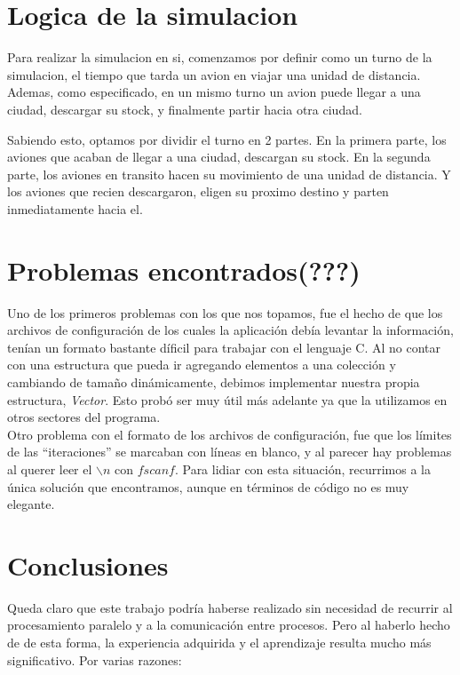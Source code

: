 \documentclass[a4paper,10pt]{article}
\begin{document}
\newpage
\section{Logica de la simulacion}
Para realizar la simulacion en si, comenzamos por definir como un turno de la simulacion, el tiempo que tarda un avion en viajar una unidad de distancia.
Ademas, como especificado, en un mismo turno un avion puede llegar a una ciudad, descargar su stock, y finalmente partir hacia otra ciudad.

Sabiendo esto, optamos por dividir el turno en 2 partes.
En la primera parte, los aviones que acaban de llegar a una ciudad, descargan su stock.
En la segunda parte, los aviones en transito hacen su movimiento de una unidad de distancia.
Y los aviones que recien descargaron, eligen su proximo destino y parten inmediatamente hacia el.

\newpage
\section{Problemas encontrados(???)}

Uno de los primeros problemas con los que nos topamos, fue el hecho de que los archivos de configuración de los cuales la aplicación debía levantar la información, tenían un formato
bastante díficil para trabajar con el lenguaje C. Al no contar con una estructura que pueda ir agregando elementos a una colección y cambiando de tamaño dinámicamente, debimos 
implementar nuestra propia estructura, \textit{Vector}. Esto probó ser muy útil más adelante ya que la utilizamos en otros sectores del programa.\\

Otro problema con el formato de los archivos de configuración, fue que los límites de las ``iteraciones'' se marcaban con líneas en blanco, y al parecer hay problemas al querer leer el 
$\backslash n$ con $fscanf$. Para lidiar con esta situación, recurrimos a la única solución que encontramos, aunque en términos de código no es muy elegante.\\

\newpage
\section{Conclusiones}

Queda claro que este trabajo podría haberse realizado sin necesidad de recurrir al procesamiento paralelo y a la comunicación entre procesos. Pero al haberlo 
hecho de de esta forma, la experiencia adquirida y el aprendizaje resulta mucho más significativo. Por varias razones:
\end{document}
